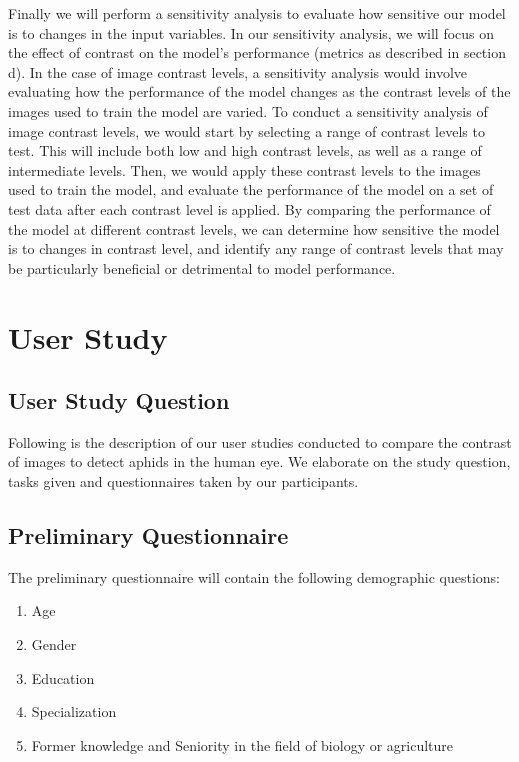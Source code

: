 \documentclass{article}
\begin{document}
Finally we will perform a sensitivity analysis to evaluate how sensitive our model is to changes in the input variables. In our sensitivity analysis, 
we will focus on the effect of contrast on the model’s performance (metrics as described in section d).
In the case of image contrast levels, a sensitivity analysis would involve evaluating how the performance of 
the model changes as the contrast levels of the images used to train the model are varied.
To conduct a sensitivity analysis of image contrast levels, we would start by selecting a range of contrast levels to test. 
This will include both low and high contrast levels, as well as a range of intermediate levels. 
Then, we would apply these contrast levels to the images used to train the model, and evaluate the performance of the model on a set of test data after each contrast level is applied.
By comparing the performance of the model at different contrast levels, we can determine how sensitive the model is to changes in contrast level, 
and identify any range of contrast levels that may be particularly beneficial or detrimental to model performance.

\newpage
\section{User Study}

\subsection{User Study Question}
Following is the description of our user studies conducted to compare the contrast of images to detect aphids in the human eye. We elaborate on the study question, tasks given and questionnaires taken by our participants.
\subsection{Preliminary Questionnaire}
The preliminary questionnaire will contain the following demographic questions: 

\begin{enumerate}
    \item Age
    \item Gender
    \item Education
    \item Specialization
    \item Former knowledge and Seniority in the field of biology or agriculture
\end{enumerate}
\end{document}
